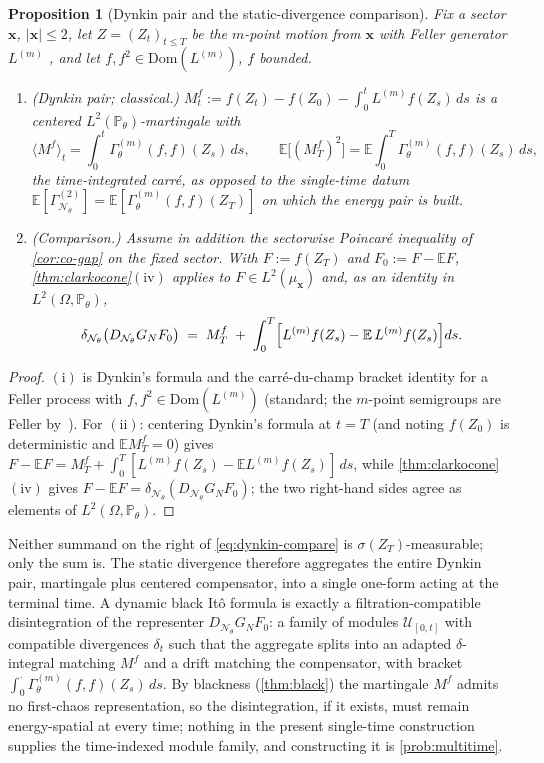 \documentclass[reqno,final,11pt]{amsart}
\theoremstyle{plain}
\newtheorem{proposition}[theorem]{Proposition}
\theoremstyle{definition}
\theoremstyle{remark}
\newcommand{\E}{\mathbb E}
\newcommand{\Prob}{\mathbb P}
\newcommand{\Dom}{\mathrm{Dom}}
\newcommand{\cN}{\mathcal N}
\newcommand{\cU}{\mathcal U}
\newcommand{\GamN}{\Gamma^{(2)}_{\cN_\theta}}
\newcommand{\DN}{D_{\cN_\theta}}
\newcommand{\divN}{\delta_{\cN_\theta}}
\newcommand{\Pth}{\Prob_{\theta}}
\begin{document}
\begin{proposition}[Dynkin pair and the static-divergence comparison]\label{prop:dynkin}
Fix a sector $\mathbf x$, $|\mathbf x|\le2$, let $Z=(Z_t)_{t\le T}$ be the
$m$-point motion from $\mathbf x$ with Feller generator $L^{(m)}$
\citep{LJR-FCN}, and let $f,f^2\in\Dom(L^{(m)})$, $f$ bounded.
\begin{enumerate}
\item[$(\mathrm i)$] (Dynkin pair; classical.)
$M^f_t:=f(Z_t)-f(Z_0)-\int_0^tL^{(m)}f(Z_s)\,ds$ is a centered
$L^2(\Pth)$-martingale with
\[
  \langle M^f\rangle_t=\int_0^t\Gamma^{(m)}_\theta(f,f)(Z_s)\,ds,
  \qquad
  \E\bigl[(M^f_T)^2\bigr]=\E\!\int_0^T\Gamma^{(m)}_\theta(f,f)(Z_s)\,ds ,
\]
the time-integrated carr\'e, as opposed to the single-time datum
$\E[\GamN]=\E[\Gamma^{(m)}_\theta(f,f)(Z_T)]$ on which the energy pair is
built.
\item[$(\mathrm{ii})$] (Comparison.) Assume in addition the sectorwise
Poincar\'e inequality of \cref{cor:co-gap} on the fixed sector. With
$F:=f(Z_T)$ and $F_0:=F-\E F$, \cref{thm:clarkocone}$(\mathrm{iv})$ applies to
$F\in L^2(\mu_{\mathbf x})$ and, as an identity in $L^2(\Omega,\Pth)$,
\begin{equation}\label{eq:dynkin-compare}
  \divN\bigl(\DN G_NF_0\bigr)
  \;=\;M^f_T\;+\;\int_0^T\Bigl[L^{(m)}f(Z_s)-\E\,L^{(m)}f(Z_s)\Bigr]ds .
\end{equation}
\end{enumerate}
\end{proposition}
\begin{proof}
$(\mathrm i)$ is Dynkin's formula and the carr\'e-du-champ bracket identity for
a Feller process with $f,f^2\in\Dom(L^{(m)})$ (standard; the $m$-point
semigroups are Feller by~\citep{LJR-FCN}). For $(\mathrm{ii})$: centering
Dynkin's formula at $t=T$ (and noting $f(Z_0)$ is deterministic and
$\E M^f_T=0$) gives
$F-\E F=M^f_T+\int_0^T[L^{(m)}f(Z_s)-\E L^{(m)}f(Z_s)]\,ds$, while
\cref{thm:clarkocone}$(\mathrm{iv})$ gives $F-\E F=\divN(\DN G_NF_0)$; the two
right-hand sides agree as elements of $L^2(\Omega,\Pth)$.
\end{proof}

Neither summand on the right of \eqref{eq:dynkin-compare} is
$\sigma(Z_T)$-measurable; only the sum is. The static divergence therefore
aggregates the entire Dynkin pair, martingale plus centered
compensator, into a single one-form acting at the terminal time. A dynamic
black It\^o formula is exactly a filtration-compatible disintegration of the
representer $\DN G_NF_0$: a family of modules $\cU_{[0,t]}$ with compatible
divergences $\delta_t$ such that the aggregate splits into an adapted
$\delta$-integral matching $M^f$ and a drift matching the compensator, with
bracket $\int_0^\cdot\Gamma^{(m)}_\theta(f,f)(Z_s)\,ds$. By blackness
(\cref{thm:black}) the martingale $M^f$ admits no first-chaos representation,
so the disintegration, if it exists, must remain energy-spatial at every time;
nothing in the present single-time construction supplies the time-indexed
module family, and constructing it is \cref{prob:multitime}.
\end{document}
